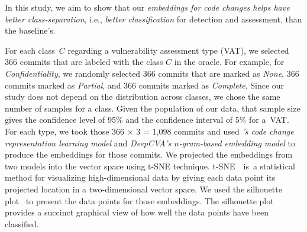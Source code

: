 



In this study, we aim to show that our {\em embeddings for code
changes helps {\tool} have better class-separation}, i.e., {\em better
classification} for detection and assessment, than the baseline's.


For each class~$C$ regarding a vulnerability assessment type (VAT), we
selected 366 commits that are labeled with the class $C$ in the
oracle. For example, for {\em Confidentiality}, we randomly selected
366 commits that are marked as {\em None}, 366 commits marked as {\em
Partial}, and 366 commits marked as {\em Complete}. Since our study
does not depend on the distribution across classes, we chose the same
number of samples for a class. Given the population of our data, that
sample size gives the confidence level of 95\% and the confidence
interval of 5\% for a~VAT.
%
For each type, we took those 366 $\times$ 3 = 1,098 commits and used
{\em {\tool}'s code change representation learning model} and {\em DeepCVA's
$n$-gram-based embedding model} to produce the embeddings for
those commits.  We projected the embeddings from two models
into the vector space using t-SNE technique. t-SNE~\cite{tsne}~is~a
statistical method for visualizing high-dimensional data by giving
each data point its projected location in a two-dimensional vector
space. We used the silhouette plot~\cite{silhouette-plot} to
present the data points for those embeddings. The silhouette plot
provides a succinct graphical view of how well the data points have
been classified.

